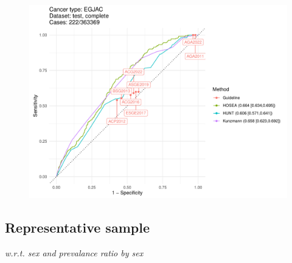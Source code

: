 \documentclass[english]{article}
\begin{document}
\begin{figure}[ht]
\includegraphics[width=1.0\linewidth]{comparison/EGJAC_complete.pdf}
\end{figure}


\newpage
\clearpage
\subsection{Representative sample}
\textit{w.r.t. sex and prevalance ratio by sex}
\end{document}

